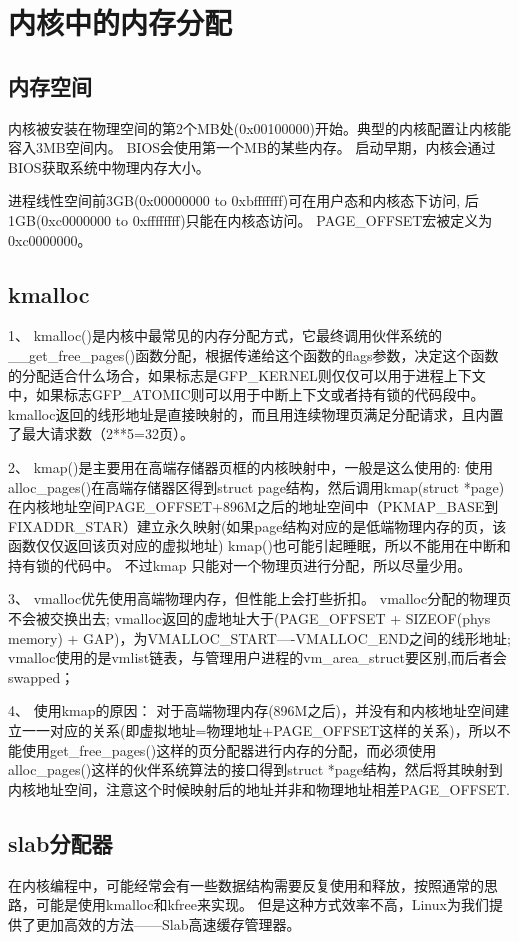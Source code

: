  
\section{内核中的内存分配}
\subsection{内存空间}
内核被安装在物理空间的第2个MB处(0x00100000)开始。典型的内核配置让内核能容入3MB空间内。
BIOS会使用第一个MB的某些内存。
启动早期，内核会通过BIOS获取系统中物理内存大小。

进程线性空间前3GB(0x00000000 to 0xbfffffff)可在用户态和内核态下访问, 后1GB(0xc0000000 to 0xffffffff)只能在内核态访问。
PAGE\_OFFSET宏被定义为0xc0000000。

\subsection{kmalloc}
1、  kmalloc()是内核中最常见的内存分配方式，它最终调用伙伴系统的\_\_get\_free\_pages()函数分配，根据传递给这个函数的flags参数，决定这个函数的分配适合什么场合，如果标志是GFP\_KERNEL则仅仅可以用于进程上下文中，如果标志GFP\_ATOMIC则可以用于中断上下文或者持有锁的代码段中。
kmalloc返回的线形地址是直接映射的，而且用连续物理页满足分配请求，且内置了最大请求数（2**5=32页）。
 
2、  kmap()是主要用在高端存储器页框的内核映射中，一般是这么使用的:
使用alloc\_pages()在高端存储器区得到struct page结构，然后调用kmap(struct *page)在内核地址空间PAGE\_OFFSET+896M之后的地址空间中（PKMAP\_BASE到FIXADDR\_STAR）建立永久映射(如果page结构对应的是低端物理内存的页，该函数仅仅返回该页对应的虚拟地址)
kmap()也可能引起睡眠，所以不能用在中断和持有锁的代码中。
不过kmap 只能对一个物理页进行分配，所以尽量少用。
 
3、  vmalloc优先使用高端物理内存，但性能上会打些折扣。
vmalloc分配的物理页不会被交换出去; 
vmalloc返回的虚地址大于(PAGE\_OFFSET + SIZEOF(phys memory) + GAP)，为VMALLOC\_START----VMALLOC\_END之间的线形地址; 
vmalloc使用的是vmlist链表，与管理用户进程的vm\_area\_struct要区别,而后者会swapped；
 
4、  使用kmap的原因：
对于高端物理内存(896M之后)，并没有和内核地址空间建立一一对应的关系(即虚拟地址=物理地址+PAGE\_OFFSET这样的关系)，所以不能使用get\_free\_pages()这样的页分配器进行内存的分配，而必须使用alloc\_pages()这样的伙伴系统算法的接口得到struct *page结构，然后将其映射到内核地址空间，注意这个时候映射后的地址并非和物理地址相差PAGE\_OFFSET.

\subsection{slab分配器}

在内核编程中，可能经常会有一些数据结构需要反复使用和释放，按照通常的思路，可能是使用kmalloc和kfree来实现。
但是这种方式效率不高，Linux为我们提供了更加高效的方法——Slab高速缓存管理器。



























